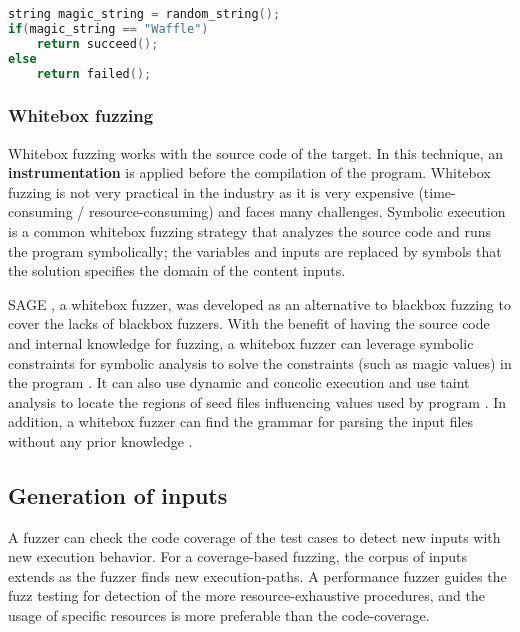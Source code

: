 \begin{lstlisting}[language=C++,style=CodeStyle,caption=Magic Value: \texttt{Waffle} is a magic value,label={lst:magic}]
string magic_string = random_string();
if(magic_string == "Waffle")
    return succeed();
else
    return failed();
\end{lstlisting}

\subsubsection{Whitebox fuzzing}
Whitebox fuzzing works with the source code of the target. In this technique, an \textbf{instrumentation} is applied before the compilation of the program. Whitebox fuzzing is not very practical in the industry as it is very expensive (time-consuming / resource-consuming) and faces many challenges. Symbolic execution \cite{king1976symbolic} is a common whitebox fuzzing strategy that analyzes the source code and runs the program symbolically; the variables and inputs are replaced by symbols that the solution specifies the domain of the content inputs. 

SAGE \cite{godefroid2012sage}, a whitebox fuzzer, was developed as an alternative to blackbox fuzzing to cover the lacks of blackbox fuzzers. With the benefit of having the source code and internal knowledge for fuzzing, a whitebox fuzzer can leverage symbolic constraints for symbolic analysis to solve the constraints (such as magic values) in the program \cite{cadar2011symbolic}. It can also use dynamic and concolic execution \cite{stephens2016driller} and use taint analysis to locate the regions of seed files influencing values used by program \cite{ganesh2009taint}. In addition, a whitebox fuzzer can find the grammar for parsing the input files without any prior knowledge \cite{godefroid2008grammar}.


\subsection{Generation of inputs}

A fuzzer can check the code coverage of the test cases to detect new inputs with new execution behavior. For a coverage-based fuzzing, the corpus of inputs extends as the fuzzer finds new execution-paths. A performance fuzzer guides the fuzz testing for detection of the more resource-exhaustive procedures, and the usage of specific resources is more preferable than the code-coverage.

